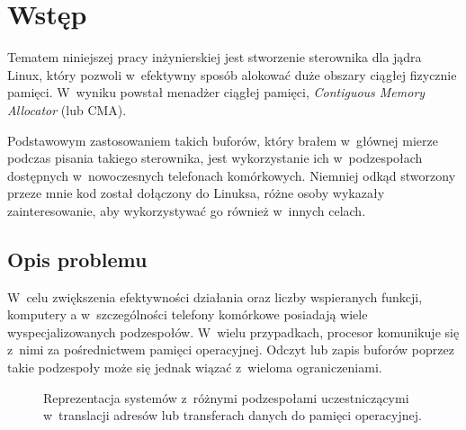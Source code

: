 \chapter{Wstęp}

Tematem niniejszej pracy inżynierskiej jest stworzenie sterownika dla
jądra Linux, który pozwoli w~efektywny sposób alokować duże obszary
ciągłej fizycznie pamięci.  W~wyniku powstał menadżer ciągłej pamięci,
{\it Contiguous Memory Allocator} (lub CMA).

Podstawowym zastosowaniem takich buforów, który brałem w~głównej
mierze podczas pisania takiego sterownika, jest wykorzystanie ich
w~podzespołach dostępnych w~nowoczesnych telefonach komórkowych.
Niemniej odkąd stworzony przeze mnie kod został dołączony do Linuksa,
różne osoby wykazały zainteresowanie, aby wykorzystywać go również
w~innych celach.


\section{Opis problemu}

W~celu zwiększenia efektywności działania oraz liczby wspieranych
funkcji, komputery a w~szczególności telefony komórkowe posiadają
wiele wyspecjalizowanych podzespołów.  W~wielu przypadkach, procesor
komunikuje się z~nimi za pośrednictwem pamięci operacyjnej.  Odczyt
lub zapis buforów poprzez takie podzespoły może się jednak wiązać
z~wieloma ograniczeniami.

\begin{figure}[tbp]
  \centering
   \qquad
  \qquad
  \caption[Różne przestrzenie adresowe dostępne
    w~komputerze.]{Reprezentacja systemów z~różnymi podzespołami
    uczestniczącymi w~translacji adresów lub transferach danych do
    pamięci operacyjnej.}
  \label{fig:mmu-iommu}
\end{figure}

